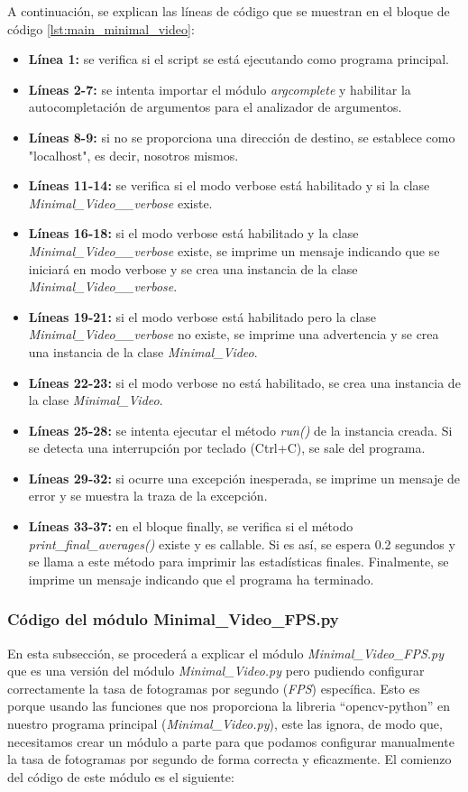 A continuación, se explican las líneas de código que se muestran en el bloque de código \ref{lst:main_minimal_video}:
\begin{itemize}
    \item \textbf{Línea 1:} se verifica si el script se está ejecutando como programa principal.
    \item \textbf{Líneas 2-7:} se intenta importar el módulo \textit{argcomplete} y habilitar la autocompletación de argumentos para el analizador de argumentos.
    \item \textbf{Líneas 8-9:} si no se proporciona una dirección de destino, se establece como "localhost", es decir, nosotros mismos.
    \item \textbf{Líneas 11-14:} se verifica si el modo verbose está habilitado y si la clase \textit{Minimal\_Video\_\_verbose} existe.
    \item \textbf{Líneas 16-18:} si el modo verbose está habilitado y la clase \textit{Minimal\_Video\_\_verbose} existe, se imprime un mensaje indicando que se iniciará en modo verbose y se crea una instancia de la clase \textit{Minimal\_Video\_\_verbose}.
    \item \textbf{Líneas 19-21:} si el modo verbose está habilitado pero la clase \textit{Minimal\_Video\_\_verbose} no existe, se imprime una advertencia y se crea una instancia de la clase \textit{Minimal\_Video}.
    \item \textbf{Líneas 22-23:} si el modo verbose no está habilitado, se crea una instancia de la clase \textit{Minimal\_Video}.
    \item \textbf{Líneas 25-28:} se intenta ejecutar el método \textit{run()} de la instancia creada. Si se detecta una interrupción por teclado (Ctrl+C), se sale del programa.
    \item \textbf{Líneas 29-32:} si ocurre una excepción inesperada, se imprime un mensaje de error y se muestra la traza de la excepción.
    \item \textbf{Líneas 33-37:} en el bloque finally, se verifica si el método \textit{print\_final\_averages()} existe y es callable. Si es así, se espera 0.2 segundos y se llama a este método para imprimir las estadísticas finales. Finalmente, se imprime un mensaje indicando que el programa ha terminado.
\end{itemize}
\vspace{\baselineskip}

\subsubsection{Código del módulo Minimal\_Video\_FPS.py}
En esta subsección, se procederá a explicar el módulo \textit{Minimal\_Video\_FPS.py} que es una versión del módulo \textit{Minimal\_Video.py} pero pudiendo configurar correctamente la tasa de fotogramas por segundo (\textit{FPS}) específica. Esto es porque usando las funciones que nos proporciona la libreria ``opencv-python'' en nuestro programa principal (\textit{Minimal\_Video.py}), este las ignora, de modo que, necesitamos crear un módulo a parte para que podamos configurar manualmente la tasa de fotogramas por segundo de forma correcta y eficazmente. El comienzo del código de este módulo es el siguiente:

